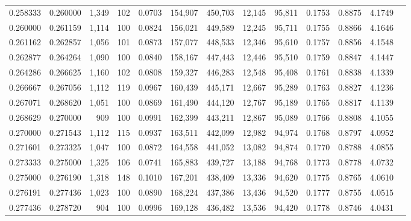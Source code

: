 \begin{tabular}{rrrrrrrrrrrrr}
0.258333 & 0.260000 &  1,349 &   102 &                                     0.0703 & 154,907 & 450,703 &  12,145 &  95,811 & 0.1753 & 0.8875 & 4.1749 \\
0.260000 & 0.261159 &  1,114 &   100 &                                     0.0824 & 156,021 & 449,589 &  12,245 &  95,711 & 0.1755 & 0.8866 & 4.1646 \\
0.261162 & 0.262857 &  1,056 &   101 &                                     0.0873 & 157,077 & 448,533 &  12,346 &  95,610 & 0.1757 & 0.8856 & 4.1548 \\
0.262877 & 0.264264 &  1,090 &   100 &                                     0.0840 & 158,167 & 447,443 &  12,446 &  95,510 & 0.1759 & 0.8847 & 4.1447 \\
0.264286 & 0.266625 &  1,160 &   102 &                                     0.0808 & 159,327 & 446,283 &  12,548 &  95,408 & 0.1761 & 0.8838 & 4.1339 \\
0.266667 & 0.267056 &  1,112 &   119 &                                     0.0967 & 160,439 & 445,171 &  12,667 &  95,289 & 0.1763 & 0.8827 & 4.1236 \\
0.267071 & 0.268620 &  1,051 &   100 &                                     0.0869 & 161,490 & 444,120 &  12,767 &  95,189 & 0.1765 & 0.8817 & 4.1139 \\
0.268629 & 0.270000 &    909 &   100 &                                     0.0991 & 162,399 & 443,211 &  12,867 &  95,089 & 0.1766 & 0.8808 & 4.1055 \\
0.270000 & 0.271543 &  1,112 &   115 &                                     0.0937 & 163,511 & 442,099 &  12,982 &  94,974 & 0.1768 & 0.8797 & 4.0952 \\
0.271601 & 0.273325 &  1,047 &   100 &                                     0.0872 & 164,558 & 441,052 &  13,082 &  94,874 & 0.1770 & 0.8788 & 4.0855 \\
0.273333 & 0.275000 &  1,325 &   106 &                                     0.0741 & 165,883 & 439,727 &  13,188 &  94,768 & 0.1773 & 0.8778 & 4.0732 \\
0.275000 & 0.276190 &  1,318 &   148 &                                     0.1010 & 167,201 & 438,409 &  13,336 &  94,620 & 0.1775 & 0.8765 & 4.0610 \\
0.276191 & 0.277436 &  1,023 &   100 &                                     0.0890 & 168,224 & 437,386 &  13,436 &  94,520 & 0.1777 & 0.8755 & 4.0515 \\
0.277436 & 0.278720 &    904 &   100 &                                     0.0996 & 169,128 & 436,482 &  13,536 &  94,420 & 0.1778 & 0.8746 & 4.0431 \\

\end{tabular}
